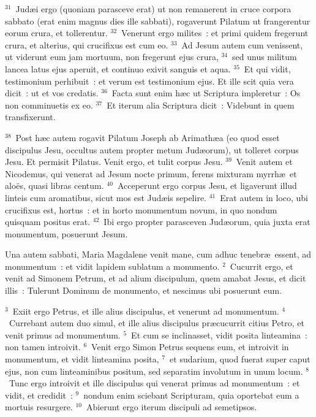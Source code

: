 ${}^{31}$~Jud\ae i ergo (quoniam parasceve erat) ut non remanerent in cruce corpora sabbato (erat enim magnus dies ille sabbati), rogaverunt Pilatum ut frangerentur eorum crura, et tollerentur.
${}^{32}$~Venerunt ergo milites~: et primi quidem fregerunt crura, et alterius, qui crucifixus est cum eo.
${}^{33}$~Ad Jesum autem cum venissent, ut viderunt eum jam mortuum, non fregerunt ejus crura,
${}^{34}$~sed unus militum lancea latus ejus aperuit, et continuo exivit sanguis et aqua.
${}^{35}$~Et qui vidit, testimonium perhibuit~: et verum est testimonium ejus. Et ille scit quia vera dicit~: ut et vos credatis.
${}^{36}$~Facta sunt enim h\ae c ut Scriptura impleretur~: Os non comminuetis ex eo.
${}^{37}$~Et iterum alia Scriptura dicit~: Videbunt in quem transfixerunt.


${}^{38}$~Post h\ae c autem rogavit Pilatum Joseph ab Arimath\ae a (eo quod esset discipulus Jesu, occultus autem propter metum Jud\ae orum), ut tolleret corpus Jesu. Et permisit Pilatus. Venit ergo, et tulit corpus Jesu.
${}^{39}$~Venit autem et Nicodemus, qui venerat ad Jesum nocte primum, ferens mixturam myrrh\ae\ et alo\"es, quasi libras centum.
${}^{40}$~Acceperunt ergo corpus Jesu, et ligaverunt illud linteis cum aromatibus, sicut mos est Jud\ae is sepelire.
${}^{41}$~Erat autem in loco, ubi crucifixus est, hortus~: et in horto monumentum novum, in quo nondum quisquam positus erat.
${}^{42}$~Ibi ergo propter parasceven Jud\ae orum, quia juxta erat monumentum, posuerunt Jesum.

\lettrine[lines=10,image=true,loversize=0.05,lraise=-0.03]{U}{}na autem sabbati, Maria Magdalene venit mane, cum adhuc tenebr\ae\ essent, ad monumentum~: et vidit lapidem sublatum a monumento.
${}^{2}$~Cucurrit ergo, et venit ad Simonem Petrum, et ad alium discipulum, quem amabat Jesus, et dicit illis~: Tulerunt Dominum de monumento, et nescimus ubi posuerunt eum.


${}^{3}$~Exiit ergo Petrus, et ille alius discipulus, et venerunt ad monumentum.
${}^{4}$~Currebant autem duo simul, et ille alius discipulus pr\ae cucurrit citius Petro, et venit primus ad monumentum.
${}^{5}$~Et cum se inclinasset, vidit posita linteamina~: non tamen introivit.
${}^{6}$~Venit ergo Simon Petrus sequens eum, et introivit in monumentum, et vidit linteamina posita,
${}^{7}$~et sudarium, quod fuerat super caput ejus, non cum linteaminibus positum, sed separatim involutum in unum locum.
${}^{8}$~Tunc ergo introivit et ille discipulus qui venerat primus ad monumentum~: et vidit, et credidit~:
${}^{9}$~nondum enim sciebant Scripturam, quia oportebat eum a mortuis resurgere.
${}^{10}$~Abierunt ergo iterum discipuli ad semetipsos.


